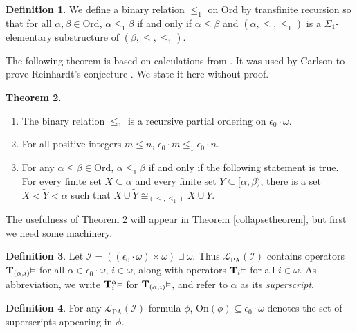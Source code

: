 \documentclass[reqno]{article}
\theoremstyle{definition}
\newtheorem{theorem}{Theorem}
\newtheorem{definition}[theorem]{Definition}
\def\L{\mathscr{L}}
\def\T{\mathbf{T}}
\def\LPA{\L_{\mathrm{PA}}}
\def\epom{\epsilon_0\cdot\omega}
\def\indset{\mathcal I}
\def\onset{\mathrm{On}}
\renewcommand{\Pr}[1]{\T_{#1}\mbox{\small${\vDash}$}}
\newcommand{\Prr}[2]{\T^{#1}_{#2}\mbox{\small${\vDash}$}}
\begin{document}
\begin{definition}
We define a binary relation $\leq_1$ on $\mathrm{Ord}$ by transfinite recursion
so that for all $\alpha,\beta\in\mathrm{Ord}$, $\alpha\leq_1\beta$ if and only if
$\alpha\leq\beta$ and $(\alpha,\leq,\leq_1)$ is a $\Sigma_1$-elementary substructure
of $(\beta,\leq,\leq_1)$.
\end{definition}

The following theorem is based on calculations from \cite{carlson1999}.
It was used by Carlson to prove Reinhardt's conjecture \cite{carlson2000}.
We state it here without proof.


\begin{theorem}
\label{blackbox}
\item
\begin{enumerate}
\item The binary relation $\leq_1$ is a recursive partial ordering on $\epom$.
\item For all positive integers $m\leq n$, $\epsilon_0\cdot m\leq_1\epsilon_0\cdot n$.
\item For any $\alpha\leq\beta\in\mathrm{Ord}$, $\alpha\leq_1\beta$ if and only if
the following statement is true.  For every finite set $X\subseteq\alpha$
and every finite set $Y\subseteq[\alpha,\beta)$, there is a set
$X<\widetilde Y<\alpha$ such that $X\cup\widetilde Y\cong_{(\leq,\leq_1)}X\cup Y$.
\end{enumerate}
\end{theorem}


The usefulness of Theorem \ref{blackbox} will appear
in Theorem \ref{collapsetheorem}, but first we need some machinery.


\begin{definition}
Let $\indset=((\epom)\times\omega)\sqcup\omega$.
Thus $\LPA(\indset)$ contains operators $\Pr{(\alpha,i)}$ for all $\alpha\in\epom$, $i\in\omega$,
along with operators $\Pr{i}$ for all $i\in\omega$.
As abbreviation,
we write $\Prr{\alpha}{i}$ for $\Pr{(\alpha,i)}$,
and refer to $\alpha$ as its \emph{superscript}.
\end{definition}

\begin{definition}
For any $\LPA(\indset)$-formula $\phi$, $\onset(\phi)\subseteq\epom$ denotes
the set of superscripts appearing in $\phi$.
\end{definition}
\end{document}
